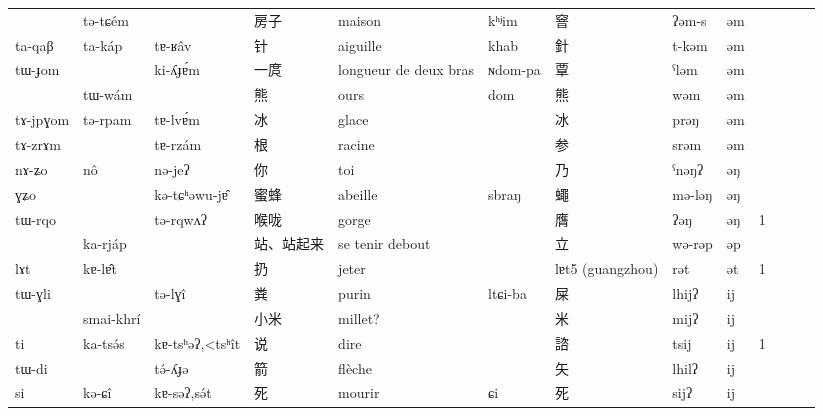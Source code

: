 \documentclass[oldfontcommands,oneside,a4paper,11pt]{article}
\newcommand{\ipa}[1]{{\phon #1}} %
\newcommand{\zh}[1]{{\cn #1}}
\begin{document}
\begin{landscape}
\begin{table}[h]
{\begin{tabular}{lllllllllllll}
\ipa{}  &	\ipa{tə-tɕém}  &	\ipa{}  &		\zh{房子}  &	maison  &	\ipa{kʰʲim}  &	\zh{窨}  &	\ipa{*ʔəm-s}  &	\ipa{əm}  &	  \\
\ipa{ta-qaβ}  &	\ipa{ta-káp}  &	\ipa{tɐ-ʁâv}  &		\zh{针}  &	aiguille  &	\ipa{khab}  &	\zh{針}  &	\ipa{*t-kəm}  &	\ipa{əm}  &	  \\
\ipa{tɯ-ɟom}  &	\ipa{}  &	\ipa{ki-ʎɟɐ́m}  &		\zh{一庹}  &	longueur de deux bras  &	\ipa{ɴdom-pa}  &	\zh{覃}  &	\ipa{*ˁləm}  &	\ipa{əm}  &	  \\
\ipa{}  &	\ipa{tɯ-wám}  &	\ipa{}  &		\zh{熊}  &	ours  &	\ipa{dom}  &	\zh{熊}  &	\ipa{*wəm}  &	\ipa{əm}  &	  \\
\ipa{tɤ-jpɣom}  &	\ipa{tə-rpam}  &	\ipa{tɐ-lvɐ́m}  &		\zh{冰}  &	glace  &	\ipa{}  &	\zh{冰}  &	\ipa{*prəŋ}  &	\ipa{əm}  &	  \\
\ipa{tɤ-zrɤm}  &	\ipa{}  &	\ipa{tɐ-rzám}  &		\zh{根}  &	racine  &	\ipa{}  &	\zh{参}  &	\ipa{*srəm}  &	\ipa{əm}  &	  \\
\ipa{nɤ-ʑo}  &	\ipa{nô}  &	\ipa{nə-jeʔ}  &		\zh{你}  &	toi  &	\ipa{}  &	\zh{乃}  &	\ipa{*ˁnəŋʔ}  &	\ipa{əŋ}  &	  \\
\ipa{ɣʑo}  &	\ipa{}  &	\ipa{kə-tɕʰəwu-jɐ̂}  &		\zh{蜜蜂}  &	abeille  &	\ipa{sbraŋ}  &	\zh{蠅}  &	\ipa{*mə-ləŋ}  &	\ipa{əŋ}  &	  \\
\ipa{tɯ-rqo}  &	\ipa{}  &	\ipa{tə-rqwʌʔ}  &		\zh{喉咙}  &	gorge  &	\ipa{}  &	\zh{膺}  &	\ipa{*ʔəŋ}  &	\ipa{əŋ}  &	1  \\
\ipa{}  &	\ipa{ka-rjáp}  &	\ipa{}  &		\zh{站、站起来}  &	se tenir debout  &	\ipa{}  &	\zh{立}  &	\ipa{*wə-rəp}  &	\ipa{əp}  &	  \\
\ipa{lɤt}  &	\ipa{kɐ-lɐ̂t}  &	\ipa{}  &		\zh{扔}  &	jeter  &	\ipa{}  &	\ipa{lɐt5 (guangzhou)}  &	\ipa{*rət}  &	\ipa{ət}  &	1  \\
\ipa{tɯ-ɣli}  &	\ipa{}  &	\ipa{tə-lɣî}  &		\zh{粪}  &	purin  &	\ipa{ltɕi-ba}  &	\zh{屎}  &	\ipa{*lhijʔ}  &	\ipa{ij}  &	  \\
\ipa{}  &	\ipa{smai-khrí}  &	\ipa{}  &		\zh{小米}  &	millet?  &	\ipa{}  &	\zh{米}  &	\ipa{*mijʔ}  &	\ipa{ij}  &	  \\
\ipa{ti}  &	\ipa{ka-tsə́s}  &	\ipa{kɐ-tsʰəʔ,<tsʰît}  &		\zh{说}  &	dire  &	\ipa{}  &	\zh{諮}  &	\ipa{*tsij}  &	\ipa{ij}  &	1  \\
\ipa{tɯ-di}  &	\ipa{}  &	\ipa{tə́-ʎɟə}  &		\zh{箭}  &	flèche  &	\ipa{}  &	\zh{矢}  &	\ipa{*lhilʔ}  &	\ipa{ij}  &	  \\
\ipa{si}  &	\ipa{kə-ɕî}  &	\ipa{kɐ-səʔ,sə́t}  &		\zh{死}  &	mourir  &	\ipa{ɕi}  &	\zh{死}  &	\ipa{*sijʔ}  &	\ipa{ij}  &	  \\

\end{tabular}}
\end{table}
\end{landscape}
\end{document}
